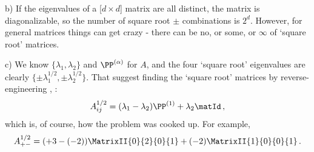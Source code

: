 {\noindent
b) If the eigenvalues of  a [$d\times{d}$] matrix are all distinct,
the matrix is diagonalizable, so
the number of square root $\pm$ combinations is $2^d$.
However, for general matrices things can get crazy - there can be
{no, or some, or $\infty$} of `square root' matrices.

\noindent
c)  We
know $\{\lambda_1,\lambda_2\}$ and $\PP^{(\alpha)}$ for $A$, and the four
`square root' eigenvalues are clearly
$\{\pm\lambda_1^{1/2},\pm\lambda_2^{1/2}\}$. That suggest finding the
`square root' matrices  by reverse-engineering
, :
\[
A_{ij}^{1/2} =(\lambda_1-\lambda_2)\PP^{(1)}  + \lambda_2\matId
\,,
\]
which is, of course, how the problem was cooked up.
For example,
\[
A_{+-}^{1/2}
 = (+3-(-2))\MatrixII{0}{2}
                     {0}{1}
  + (-2)\MatrixII{1}{0}
                 {0}{1}
\,.
\]
    } %
